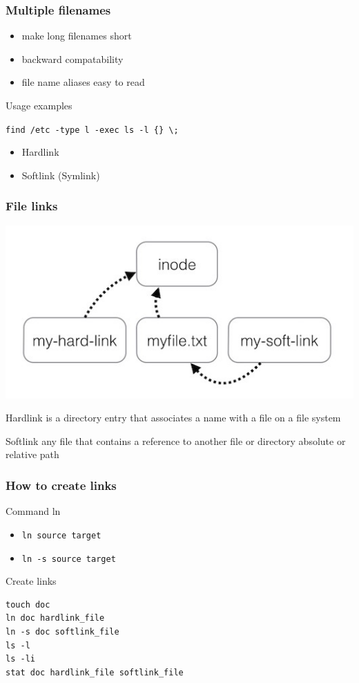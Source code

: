\begin{frame}[fragile]
	\frametitle{Multiple filenames}
			\begin{itemize}
				\item make long filenames short
				\item backward compatability
				\item file name aliases easy to read
			\end{itemize}
			\pause
			Usage examples

			\verb|find /etc -type l -exec ls -l {} \;|
			\begin{itemize}
				\item Hardlink
				\item Softlink (Symlink)
			\end{itemize}
\end{frame}

\begin{frame}[fragile]
	\frametitle{File links}
	\includegraphics[height=0.4\textheight]{../../slides/cmdline/clipart/hardlink_softlink.jpg}
	\begin{block}{Hardlink}
	is a directory entry that associates a name with a file on a file system
        \end{block}
	\begin{block}{Softlink}
	any file that contains a reference to another file or directory 
	absolute or relative path 
        \end{block}
\end{frame}

\begin{frame}[fragile]
	\frametitle{How to create links}
	\begin{block}{Command ln}
		\begin{itemize}
			\item {\tt ln source target}
			\item {\tt ln -s source target}
		\end{itemize}
        \end{block}
	Create links

	\begin{lstlisting}
touch doc 
ln doc hardlink_file
ln -s doc softlink_file
ls -l
ls -li
stat doc hardlink_file softlink_file
\end{lstlisting}
\end{frame}

